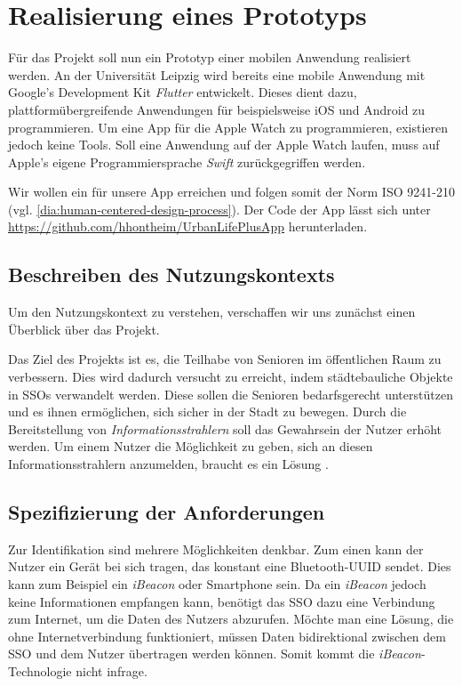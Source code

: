 \chapter{Realisierung eines Prototyps}

Für das Projekt  soll nun ein Prototyp einer mobilen Anwendung realisiert werden. An der Universität Leipzig wird bereits eine mobile Anwendung mit Google's Development Kit \emph{Flutter} entwickelt. Dieses dient dazu, plattformübergreifende Anwendungen für beispielsweise iOS und Android zu programmieren. Um eine App für die Apple Watch zu programmieren, existieren jedoch keine Tools. Soll eine Anwendung auf der Apple Watch laufen, muss auf Apple's eigene Programmiersprache \emph{Swift} zurückgegriffen werden.

Wir wollen ein  für unsere App erreichen und folgen somit der Norm ISO 9241-210 (vgl. \autoref{dia:human-centered-design-process}). Der Code der App lässt sich unter \url{https://github.com/hhontheim/UrbanLifePlusApp} herunterladen.

\section{Beschreiben des Nutzungskontexts}

Um den Nutzungskontext zu verstehen, verschaffen wir uns zunächst einen Überblick über das Projekt.

Das Ziel des Projekts ist es, die Teilhabe von Senioren im öffentlichen Raum zu verbessern. Dies wird dadurch versucht zu erreicht, indem städtebauliche Objekte in \acp{SSO} verwandelt werden. Diese sollen die Senioren bedarfsgerecht unterstützen und es ihnen ermöglichen, sich sicher in der Stadt zu bewegen. Durch die Bereitstellung von \emph{Informationsstrahlern} soll das Gewahrsein der Nutzer erhöht werden. Um einem Nutzer die Möglichkeit zu geben, sich an diesen Informationsstrahlern anzumelden, braucht es ein Lösung \cite{Fietkau:2020:FuE-Vorhaben-Informationsstrahler---Backend,Fietkau:2020:FuE-Vorhaben-Informationsstrahler---MTI-Gestaltung}.

\section{Spezifizierung der Anforderungen}

Zur Identifikation sind mehrere Möglichkeiten denkbar. Zum einen kann der Nutzer ein Gerät bei sich tragen, das konstant eine Bluetooth-UUID sendet. Dies kann zum Beispiel ein \emph{iBeacon} oder Smartphone sein. Da ein \emph{iBeacon} jedoch keine Informationen empfangen kann, benötigt das \ac{SSO} dazu eine Verbindung zum Internet, um die Daten des Nutzers abzurufen. Möchte man eine Lösung, die ohne Internetverbindung funktioniert, müssen Daten bidirektional zwischen dem \ac{SSO} und dem Nutzer übertragen werden können. Somit kommt die \emph{iBeacon}-Technologie nicht infrage.

